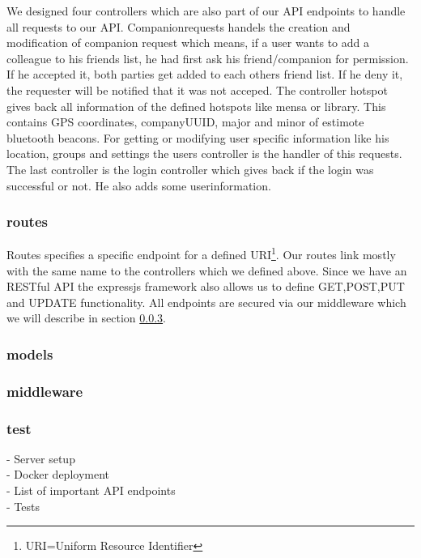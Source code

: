 We designed four controllers which are also part of our API endpoints to handle all requests to our API. Companionrequests handels the creation and modification of companion request which means, if a user wants to add a colleague to his friends list, he had first ask his friend/companion for permission. If he accepted it, both parties get added to each others friend list. If he deny it, the requester will be notified that it was not acceped. The controller hotspot gives back all information of the defined hotspots like mensa or library. This contains GPS coordinates, companyUUID, major and minor of estimote bluetooth beacons. For getting or modifying user specific information like his location, groups and settings the users controller is the handler of this requests. The last controller is the login controller which gives back if the login was successful or not. He also adds some userinformation.

\subsubsection{routes}

Routes specifies a specific endpoint for a defined URI\footnote{URI=Uniform Resource Identifier}. Our routes link mostly with the same name to the controllers which we defined above. Since we have an RESTful API the expressjs framework also allows us to define GET,POST,PUT and UPDATE functionality. All endpoints are secured via our middleware which we will describe in section \ref{backend-middleware}.

\subsubsection{models}



\subsubsection{middleware}
\label{backend-middleware}

\subsubsection{test}

- Server setup\\
- Docker deployment\\
- List of important API endpoints\\
- Tests

